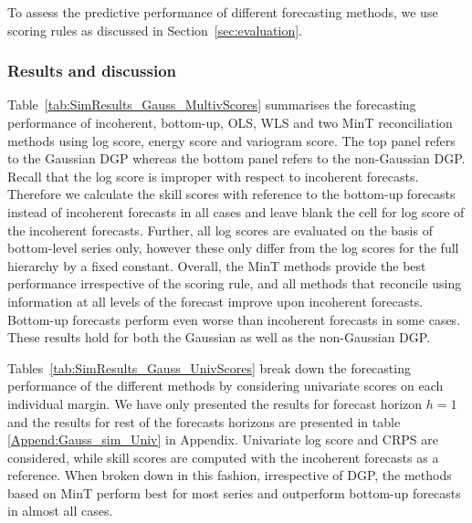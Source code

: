 \documentclass[12pt]{article}
\theoremstyle{definition}
\begin{document}
To assess the predictive performance of different forecasting methods, we use scoring rules as discussed in Section~\ref{sec:evaluation}. 

\subsubsection{Results and discussion}

Table~\ref{tab:SimResults_Gauss_MultivScores} summarises the forecasting performance of incoherent, bottom-up, OLS, WLS and two MinT reconciliation methods using log score, energy score and variogram score. The top panel refers to the Gaussian DGP whereas the bottom panel refers to the non-Gaussian DGP. Recall that the log score is improper with respect to incoherent forecasts. Therefore we calculate the skill scores with reference to the bottom-up forecasts instead of incoherent forecasts in all cases and leave blank the cell for log score of the incoherent forecasts. Further, all log scores are evaluated on the basis of bottom-level series only, however these only differ from the log scores for the full hierarchy by a fixed constant. Overall, the MinT methods provide the best performance irrespective of the scoring rule, and all methods that reconcile using information at all levels of the forecast improve upon incoherent forecasts. Bottom-up forecasts perform even worse than incoherent forecasts in some cases. These results hold for both the Gaussian as well as the non-Gaussian DGP.

Tables~\ref{tab:SimResults_Gauss_UnivScores} break down the forecasting performance of the different methods by considering univariate scores on each individual margin. We have only presented the results for forecast horizon $h=1$ and the results for rest of the forecasts horizons are presented in table \ref{Append:Gauss_sim_Univ} in Appendix.  Univariate log score and CRPS are considered, while skill scores are computed with the incoherent forecasts as a reference. When broken down in this fashion, irrespective of DGP, the methods based on MinT perform best for most series and outperform bottom-up forecasts in almost all cases. 
\end{document}
